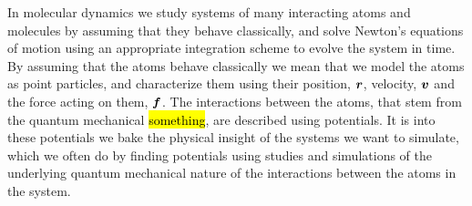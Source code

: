 % 
% 
% 
% 



In molecular dynamics we study systems of many interacting atoms and molecules by assuming that they behave classically, and solve Newton's equations of motion using an appropriate integration scheme to evolve the system in time. By assuming that the atoms behave classically we mean that we model the atoms as point particles, and characterize them using their position, $\boldsymbol{r}$, velocity, $\boldsymbol{v}$ and the force acting on them, $\boldsymbol{f}$. The interactions between the atoms, that stem from the quantum mechanical \hl{something}, are described using potentials. It is into these potentials we bake the physical insight of the systems we want to simulate, which we often do by finding potentials using studies and simulations of the underlying quantum mechanical nature of the interactions between the atoms in the system.
